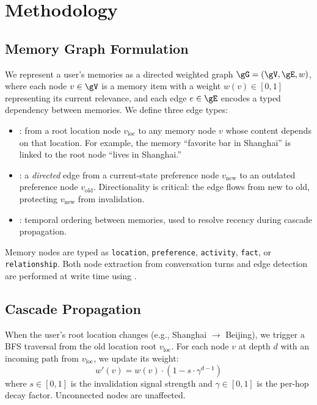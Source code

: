 \section{Methodology}
\label{sec:method}

\subsection{Memory Graph Formulation}
\label{sec:method:graph}

We represent a user's memories as a directed weighted graph $\gG = (\gV, \gE, w)$, where each node $v \in \gV$ is a memory item with a weight $w(v) \in [0, 1]$ representing its current relevance, and each edge $e \in \gE$ encodes a typed dependency between memories. We define three edge types:

\begin{itemize}[itemsep=2pt]
    \item \textbf{\locatedin}: from a root location node $v_{\text{loc}}$ to any memory node $v$ whose content depends on that location. For example, the memory ``favorite bar in Shanghai'' is linked to the root node ``lives in Shanghai.''
    \item \textbf{\conflictswith}: a \textit{directed} edge from a current-state preference node $v_{\text{new}}$ to an outdated preference node $v_{\text{old}}$. Directionality is critical: the edge flows from new to old, protecting $v_{\text{new}}$ from invalidation.
    \item \textbf{\precedes}: temporal ordering between memories, used to resolve recency during cascade propagation.
\end{itemize}

Memory nodes are typed as \texttt{location}, \texttt{preference}, \texttt{activity}, \texttt{fact}, or \texttt{relationship}. Both node extraction from conversation turns and edge detection are performed at write time using \gptfouromini.

\subsection{Cascade Propagation}
\label{sec:method:cascade}

When the user's root location changes (e.g., Shanghai $\rightarrow$ Beijing), we trigger a BFS traversal from the old location root $v_{\text{loc}}$. For each node $v$ at depth $d$ with an incoming \locatedin path from $v_{\text{loc}}$, we update its weight:
\begin{equation}
    w'(v) = w(v) \cdot \left(1 - s \cdot \gamma^{d-1}\right)
    \label{eq:structural_cascade}
\end{equation}
where $s \in [0,1]$ is the invalidation signal strength and $\gamma \in [0,1]$ is the per-hop decay factor. Unconnected nodes are unaffected.

